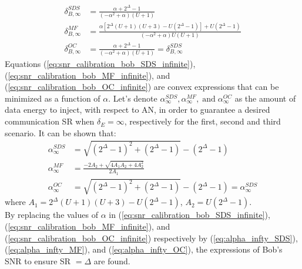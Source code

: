 \documentclass[12pt, draftclsnofoot, onecolumn]{IEEEtran}
\begin{document}
\begin{align}
\delta_{B,\infty}^{SDS} &= \frac{\alpha + 2^\Delta - 1}{(-\alpha^2 + \alpha)(U+1)}
\label{eq:snr_calibration_bob_SDS_infinite} \\
\delta_{B,\infty}^{MF} &= \frac{\alpha\left[  2^\Delta(U+1)(U+3) - U(2^\Delta-1)  \right] + U(2^\Delta-1)}{(-\alpha^2 + \alpha)U(U+1)} 
\label{eq:snr_calibration_bob_MF_infinite}\\
\delta_{B,\infty}^{OC} &= \frac{\alpha + 2^\Delta - 1}{(-\alpha^2 + \alpha)(U+1)} = \delta_{B,\infty}^{SDS}
\label{eq:snr_calibration_bob_OC_infinite}
\end{align}
Equations  (\ref{eq:snr_calibration_bob_SDS_infinite}), (\ref{eq:snr_calibration_bob_MF_infinite}), and (\ref{eq:snr_calibration_bob_OC_infinite}) are convex expressions that can be minimized as a function of $\alpha$. Let's denote $\alpha_{\infty}^{SDS}, \alpha_{\infty}^{MF}, \; \text{and}\; \alpha_{\infty}^{OC}$ as the amount of data energy to inject, with respect to AN, in order to guarantee a desired communication SR when $\delta_E = \infty$, respectively for the first, second and third scenario. It can be shown that:
\begin{align}
	\alpha_{\infty}^{SDS} &= \sqrt{(2^\Delta -1)^2 + (2^\Delta -1)} - (2^\Delta -1)
	\label{eq:alpha_infty_SDS} \\
	\alpha_{\infty}^{MF} &= \frac{-2A_2+\sqrt{4A_1A_2 + 4A_2^2}}{2A_1} 
	\label{eq:alpha_infty_MF} \\
	\alpha_{\infty}^{OC} &= \sqrt{(2^\Delta -1)^2 + (2^\Delta -1)} - (2^\Delta -1) = \alpha_{\infty}^{SDS}
	\label{eq:alpha_infty_OC}
\end{align}
where $A_1 = 2^\Delta(U+1)(U+3)-U(2^\Delta-1)$, $A_2 = U(2^\Delta-1)$.\\
By replacing the values of $\alpha$ in (\ref{eq:snr_calibration_bob_SDS_infinite}), (\ref{eq:snr_calibration_bob_MF_infinite}), and (\ref{eq:snr_calibration_bob_OC_infinite}) respectively by (\ref{eq:alpha_infty_SDS}), (\ref{eq:alpha_infty_MF}), and (\ref{eq:alpha_infty_OC}), the expressions of Bob's SNR to ensure SR $=\Delta$ are found.









\end{document}
